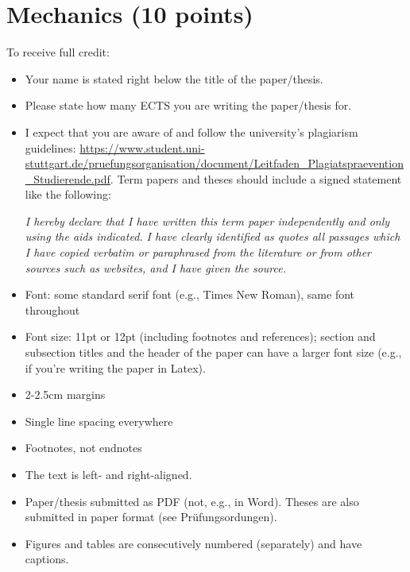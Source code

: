 \documentclass[11pt,fleqn,a4paper/thesis]{article}
\newcommand{\6}{\mbox{$[\hspace*{-.6mm}[$}}
\newcommand{\9}{\mbox{$]\hspace*{-.6mm}]$}}
\begin{document}
\section{Mechanics (10 points)}

To receive full credit:

\begin{itemize}[itemsep=-1pt,leftmargin=2.5ex,topsep=-2pt]

\item Your name is stated right below the title of the paper/thesis. 

\item Please state how many ECTS you are writing the paper/thesis for.

\item I expect that you are aware of and follow the university's plagiarism guidelines: \url{https://www.student.uni-stuttgart.de/pruefungsorganisation/document/Leitfaden_Plagiatspraevention_Studierende.pdf}. Term papers and theses should include a signed statement like the following:

{\em I hereby declare that I have written this term paper independently and only using the aids indicated. I have clearly identified as quotes all passages which I have copied verbatim or paraphrased from the literature or from other sources such as websites, and I have given the source.}

\item Font: some standard serif font (e.g., Times New Roman), same font throughout

\item Font size: 11pt or 12pt (including footnotes and references); section and subsection titles and the header of the paper can have a larger font size (e.g., if you're writing the paper in Latex).

\item 2-2.5cm margins 

\item Single line spacing everywhere

\item Footnotes, not endnotes

\item The text is left- and right-aligned.

\item Paper/thesis submitted as PDF (not, e.g., in Word). Theses are also submitted in paper format (see Pr\"ufungsordungen).

\item Figures and tables are consecutively numbered (separately) and have captions.


\end{itemize}
\end{document}
